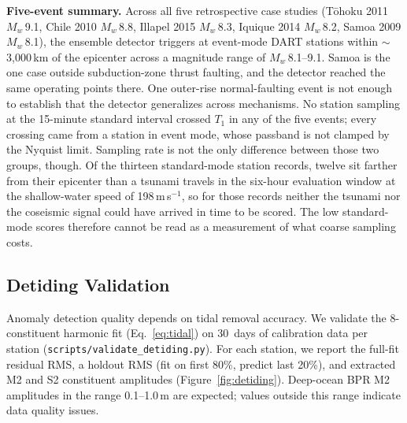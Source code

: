 \documentclass{article}
\begin{document}
\noindent\textbf{Five-event summary.}
Across all five retrospective case studies
(T\={o}hoku 2011 $M_w$\,9.1, Chile 2010 $M_w$\,8.8, Illapel 2015
$M_w$\,8.3, Iquique 2014 $M_w$\,8.2, Samoa 2009 $M_w$\,8.1),
the ensemble detector triggers at event-mode DART stations within
$\sim$3{,}000\,km of the epicenter across a magnitude range of
$M_w$\,8.1--9.1.  Samoa is the one case outside subduction-zone thrust faulting, and the
detector reached the same operating points there.  One outer-rise
normal-faulting event is not enough to establish that the detector
generalizes across mechanisms.
No station sampling at the 15-minute standard interval crossed $T_1$ in
any of the five events; every crossing came from a station in event
mode, whose passband is not clamped by the Nyquist limit.  Sampling
rate is not the only difference between those two groups, though.  Of
the thirteen standard-mode station records, twelve sit farther from
their epicenter than a tsunami travels in the six-hour evaluation
window at the shallow-water speed of 198\,m\,s$^{-1}$, so for those
records neither the tsunami nor the coseismic signal could have
arrived in time to be scored.  The low standard-mode scores therefore
cannot be read as a measurement of what coarse sampling costs.

\FloatBarrier
\subsection{Detiding Validation}
\label{sec:eval-detiding}

Anomaly detection quality depends on tidal removal accuracy.
We validate the 8-constituent harmonic fit (Eq.~\ref{eq:tidal}) on 30~days of calibration data
per station (\texttt{scripts/validate\_detiding.py}).
For each station, we report the full-fit residual RMS, a holdout RMS
(fit on first 80\%, predict last 20\%), and extracted M2 and S2
constituent amplitudes (Figure~\ref{fig:detiding}).
Deep-ocean BPR M2 amplitudes in the range 0.1--1.0\,m are expected;
values outside this range indicate data quality issues.
\end{document}
